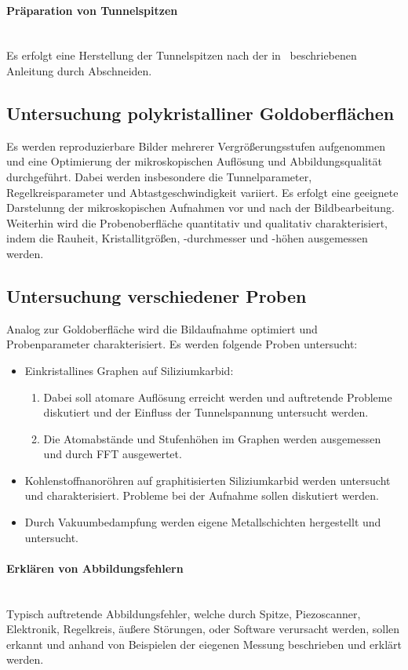\documentclass[a4paper,twoside,final]{article}
\begin{document}
\paragraph*{Präparation von Tunnelspitzen}$~$\\
Es erfolgt eine Herstellung der Tunnelspitzen nach der in~\cite{Nanosurf} beschriebenen Anleitung durch Abschneiden.
\subsection{Untersuchung polykristalliner Goldoberflächen}
Es werden reproduzierbare Bilder mehrerer Vergrößerungsstufen aufgenommen und eine Optimierung der mikroskopischen Auflösung und Abbildungsqualität durchgeführt. Dabei werden insbesondere die Tunnelparameter, Regelkreisparameter und Abtastgeschwindigkeit variiert. Es erfolgt eine geeignete Darstelunng der mikroskopischen Aufnahmen vor und nach der Bildbearbeitung.\\
Weiterhin wird die Probenoberfläche quantitativ und qualitativ charakterisiert, indem die Rauheit, Kristallitgrößen, -durchmesser und -höhen ausgemessen werden.
\subsection{Untersuchung verschiedener Proben}
Analog zur Goldoberfläche wird die Bildaufnahme optimiert und Probenparameter charakterisiert. Es werden folgende Proben untersucht:
\begin{itemize}
  \item Einkristallines Graphen auf Siliziumkarbid:
  \begin{enumerate}
    \item Dabei soll atomare Auflösung erreicht werden und auftretende Probleme diskutiert und der Einfluss der Tunnelspannung untersucht werden.
    \item Die Atomabstände und Stufenhöhen im Graphen werden ausgemessen und durch FFT ausgewertet.
  \end{enumerate}
  \item Kohlenstoffnanoröhren auf graphitisierten Siliziumkarbid werden untersucht und charakterisiert. Probleme bei der Aufnahme sollen diskutiert werden.
  \item Durch Vakuumbedampfung werden eigene Metallschichten hergestellt und untersucht.
\end{itemize}

\paragraph{Erklären von Abbildungsfehlern}$~$\\
Typisch auftretende Abbildungsfehler, welche durch Spitze, Piezoscanner, Elektronik, Regelkreis, äußere Störungen, oder Software verursacht werden, sollen erkannt und anhand von Beispielen der eiegenen Messung beschrieben und erklärt werden.
\end{document}
